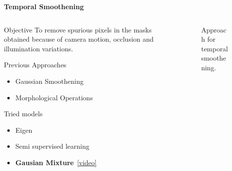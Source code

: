 \begin{frame}{\textbf{Temporal Smoothening}}
\begin{columns}
	\begin{column}{0.48\textwidth}
		\begin{varblock}[\textwidth]{Objective}
			To remove  spurious pixels in the masks obtained because of camera motion, occlusion and illumination variations.
		\end{varblock}
		\begin{varblock}[\textwidth]{Previous Approaches}
			\begin{itemize}
				\item Gaussian Smoothening
				\item Morphological Operations
			\end{itemize}
		\end{varblock}
		\begin{varblock}[\textwidth]{Tried models}
				\begin{itemize}
				\item Eigen
				\item Semi supervised learning
				\item \textbf{\color{blue}Gausian Mixture}~\href{run:videos/smooth/dance.avi}{{\color{red}[video]}}
			\end{itemize}	
		\end{varblock}
	\end{column}
	\begin{column}{0.48\textwidth}
	\begin{figure}
		\centering
		\caption{Approach for temporal smoothening.}
	\end{figure}
	\end{column}
\end{columns}
\end{frame}

